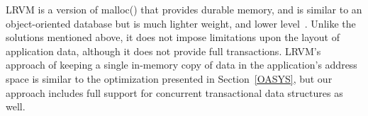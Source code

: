 \documentclass[10pt,letterpaper,twocolumn,english]{article}
\newcommand{\yad}{LLADD\xspace}
\begin{document}

LRVM is a version of malloc() that provides
durable memory, and is similar to an object-oriented database
but is much lighter weight, and lower level~\cite{lrvm}.  Unlike 
the solutions mentioned above, it does not impose limitations upon 
the layout of application data, although it does not provide full transactions.
LRVM's
approach of keeping a single in-memory copy of data in the application's
address space is similar to the optimization presented in
Section~\ref{OASYS}, but our approach includes full support for 
concurrent transactional data structures as well.



\end{document}

